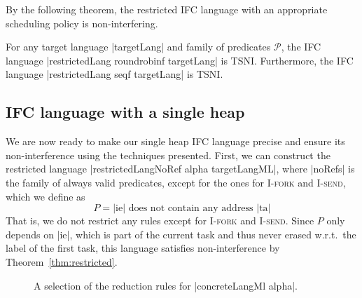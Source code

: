 By the following theorem, the restricted IFC language with an
appropriate scheduling policy is non-interfering.

\begin{theorem}
  \label{thm:restricted}
  For any target language |targetLang| and family of predicates
  $\mathcal{P}$, the IFC language |restrictedLang roundrobinf targetLang|
  is TSNI.  Furthermore, the IFC language
  |restrictedLang seqf targetLang| is TSNI.
\end{theorem}


\subsection{IFC language with a single heap}

We are now ready to make our single heap IFC language precise and
ensure its non-interference using the techniques presented.
First, we can construct the restricted language
|restrictedLangNoRef alpha targetLangML|, where |noRefs| is
the family of always valid predicates, except for the ones for
\textsc{I-fork} and \textsc{I-send}, which we define as
\[ P = \text{|ie| does not contain any address |ta|} \]
That is, we do not restrict any rules except for \textsc{I-fork}
and \textsc{I-send}.
Since $P$ only depends on |ie|, which is part of the current
task and thus never erased w.r.t.\ the label of the first task,
this language satisfies non-interference by Theorem~\ref{thm:restricted}.

\begin{figure}
  
  
  \caption{A selection of the reduction rules for |concreteLangMl alpha|.}
  \label{fig:concrete}
\end{figure}

